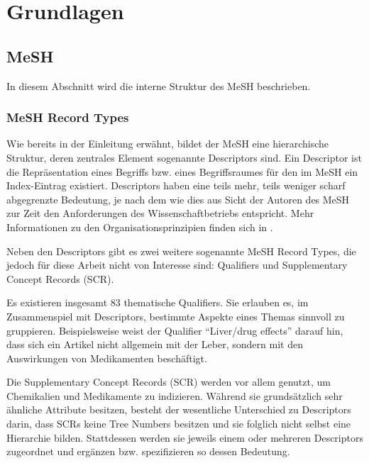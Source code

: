 \section{Grundlagen}

\subsection{MeSH}
\label{sec:mesh}
In diesem Abschnitt wird die interne Struktur des MeSH beschrieben.

\subsubsection{MeSH Record Types}

Wie bereits in der Einleitung erwähnt, bildet der MeSH eine hierarchische Struktur, deren zentrales Element sogenannte Descriptors sind. Ein Descriptor ist die Repräsentation eines Begriffs bzw. eines Begriffsraumes für den im MeSH ein Index-Eintrag existiert. Descriptors haben eine teils mehr, teils weniger scharf abgegrenzte Bedeutung, je nach dem wie dies aus Sicht der Autoren des MeSH zur Zeit den Anforderungen des Wissenschaftbetriebs entspricht. Mehr Informationen zu den Organisationsprinzipien finden sich in \cite{MeSHOrgPrinciples2012}.\par

Neben den Descriptors gibt es zwei weitere sogenannte MeSH Record Types, die jedoch für diese Arbeit nicht von Interesse sind: Qualifiers und Supplementary Concept Records (SCR).\par

Es existieren insgesamt 83 thematische Qualifiers. Sie erlauben es, im Zusammenspiel mit Descriptors, bestimmte Aspekte eines Themas sinnvoll zu gruppieren. Beispielsweise weist der Qualifier "`Liver/drug effects"' darauf hin, dass sich ein Artikel nicht allgemein mit der Leber, sondern mit den Auswirkungen von Medikamenten beschäftigt.

Die Supplementary Concept Records (SCR) werden vor allem genutzt, um Chemikalien und Medikamente zu indizieren. Während sie grundsätzlich sehr ähnliche Attribute besitzen, besteht der wesentliche Unterschied zu Descriptors darin, dass SCRs keine Tree Numbers besitzen und sie folglich nicht selbst eine Hierarchie bilden. Stattdessen werden sie jeweils einem oder mehreren Descriptors zugeordnet und ergänzen bzw. spezifizieren so dessen Bedeutung. \par

